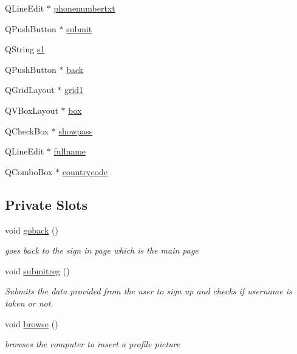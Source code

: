 \begin{DoxyCompactItemize}
Q\+Line\+Edit $\ast$ \hyperlink{classSignUp_a6deaa5313982b37d4f4ce4d0e7636b2e}{phonenumbertxt}
\item 
Q\+Push\+Button $\ast$ \hyperlink{classSignUp_aa733427c622c970bb273768fe266cda6}{submit}
\item 
Q\+String \hyperlink{classSignUp_af94f0e768fbc875b92de3db057ac8a58}{s1}
\item 
Q\+Push\+Button $\ast$ \hyperlink{classSignUp_a3118da992e3ddddad55aefb058d3f181}{back}
\item 
Q\+Grid\+Layout $\ast$ \hyperlink{classSignUp_a49c9d24e80103ea51677a94ba7100fa1}{grid1}
\item 
Q\+V\+Box\+Layout $\ast$ \hyperlink{classSignUp_ab2c944409ffb7239cc660d27cb5427fb}{box}
\item 
Q\+Check\+Box $\ast$ \hyperlink{classSignUp_ac466869c89fe53445de505714c341837}{showpass}
\item 
Q\+Line\+Edit $\ast$ \hyperlink{classSignUp_a6da38bd0aaebade4679524fcda54b840}{fullname}
\item 
Q\+Combo\+Box $\ast$ \hyperlink{classSignUp_af7122b0a061a921f749e077532136a21}{countrycode}
\end{DoxyCompactItemize}
\subsection*{Private Slots}
\begin{DoxyCompactItemize}
\item 
void \hyperlink{classSignUp_a1539bfb27c3778d424ebeb4c50210e3d}{goback} ()
\begin{DoxyCompactList}\small\item\em goes back to the sign in page which is the main page \end{DoxyCompactList}\item 
void \hyperlink{classSignUp_aad0f6a54d93f8354e13db101189e2319}{submitreg} ()
\begin{DoxyCompactList}\small\item\em Submits the data provided from the user to sign up and checks if username is taken or not. \end{DoxyCompactList}\item 
void \hyperlink{classSignUp_ab35d78276292f7e585b78cb98a5c720a}{browse} ()
\begin{DoxyCompactList}\small\item\em browses the computer to insert a profile picture \end{DoxyCompactList}\end{DoxyCompactItemize}


